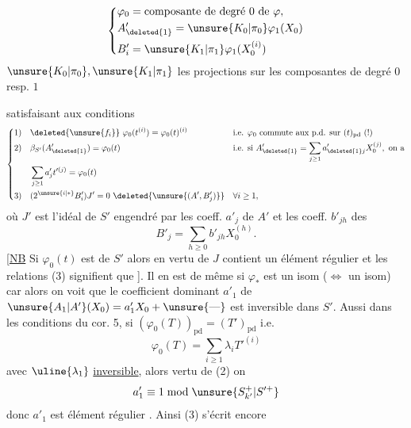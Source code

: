 \[
 \left\{\begin{aligned}
 &\varphi_0=\text{composante de degré }0\text{ de }\varphi,\\
 &A'_{\deleted{1}}=\unsure{K_0|\pi_0}\varphi_1(X_0)\\
 &B'_i=\unsure{K_1|\pi_1}\varphi_1(X_0^{(i)})
 \end{aligned}\right.
\]
$\unsure{K_0|\pi_0},\unsure{K_1|\pi_1}$ les projections sur les composantes de degré $0$ resp. $1$

satisfaisant aux conditions
\[
 \left\{\begin{aligned}
 1)\quad&\deleted{\unsure{f_i}}\ \varphi_0(t^{(i)})=\varphi_0(t)^{(i)}
 &&\text{i.e. }\varphi_0\text{ commute aux p.d. sur }(t)_{\mathrm{pd}}\ (!)\\
 2)\quad&\beta_{S'}(A'_{\deleted{1}})=\varphi_0(t)
 &&\text{i.e. si }A'_{\deleted{1}}=\sum_{j\geq1}a'_{\deleted{1}j}X_0^{(j)},\text{ on a}\\
 &\sum_{j\geq1}a'_j t'^{(j)}=\varphi_0(t)\\
 3)\quad&(2^{\unsure{i|*}}B'_i)J'=0\ \deleted{\unsure{(A',B'_j)}}
 &&\forall i\geq1,
 \end{aligned}\right.
\]
où $J'$ est l'idéal de $S'$ engendré par les coeff. $a'_j$ de $A'$ et les coeff. $b'_{jh}$ des
\[
 B'_j=\sum_{h\geq0}b'_{jh}X_0^{(h)}.
\]
[\uline{NB} Si $\varphi_0(t)$ est   de $S'$ alors en vertu de  $J$ contient un élément régulier et les relations 
(3) signifient que
]. Il en est de même si $\varphi_*$ est un isom
($\Leftrightarrow$  un isom) car alors on voit que le coefficient dominant $a'_1$ de $\unsure{A_1|A'}(X_0)=a'_1X_0+\unsure{\mathbin{\text{---}}}$ est inversible dans $S'$.
Aussi dans les conditions du cor. 5, si $(\varphi_0(T))_{\mathrm{pd}}=(T')_{\mathrm{pd}}$ i.e.
\[
 \varphi_0(T)=\sum_{i\geq1}\lambda_i T'^{(i)}
\]
avec $\uline{\lambda_1}$ \uline{inversible}, alors  vertu de (2) on 
\[
 a'_1\equiv1\bmod\unsure{S_{k'}^+|S'^+}
\]
donc $a'_1$ est élément régulier .
Ainsi (3) s'écrit encore

